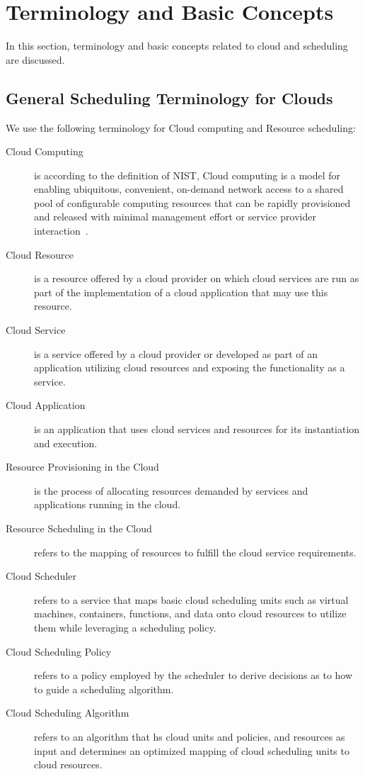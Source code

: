 \documentclass[final,5p,times,twocolumn]{elsarticle}
\begin{document}
\section{Terminology and Basic Concepts}\label{sec:terminology}

In this section, terminology and basic concepts related to cloud and scheduling are discussed.

\subsection{General Scheduling Terminology for Clouds}

We use the following terminology for Cloud computing and Resource scheduling:

\begin{description}

\item[Cloud Computing] is according to the definition of NIST, Cloud computing is a model for enabling ubiquitous, convenient, on-demand network access to a shared pool of configurable computing resources that can be rapidly provisioned and released with minimal management effort or service provider interaction~\cite{mell2011nist}.

\item[Cloud Resource] is a resource offered by a cloud provider on which cloud services are run as part of the implementation of a cloud application that may use this resource.

\item[Cloud Service] is a service offered by a cloud provider or developed as part of an application utilizing cloud resources and exposing the functionality as a service.
 
\item[Cloud Application] is an application that uses cloud services and resources for its instantiation and execution.

\item[Resource Provisioning in the Cloud] is the process of allocating resources demanded by services and applications running in the cloud.
 
\item[Resource Scheduling in the Cloud] refers to the mapping of resources to fulfill the cloud service requirements.

\item[Cloud Scheduler] refers to a service that maps basic cloud scheduling units such as virtual machines, containers, functions, and data onto cloud resources to utilize them while leveraging a scheduling policy. 

\item[Cloud Scheduling Policy] refers to a policy employed by the scheduler to derive decisions as to how to guide a scheduling algorithm.

\item[Cloud Scheduling Algorithm] refers to an algorithm that hs cloud units and policies, and resources as input and determines an optimized mapping of cloud scheduling units to cloud resources.
 
\end{description}
\end{document}
